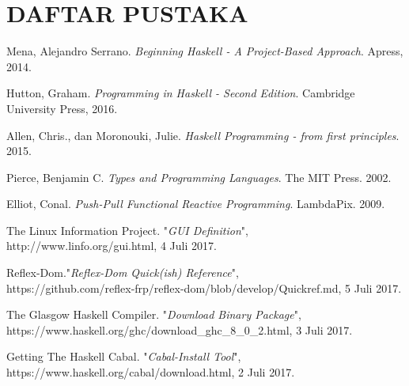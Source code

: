 \documentclass[pi.tex]{subfile}
\begin{document}
\chapter*{DAFTAR PUSTAKA}

\begin{enumerate}[label={[\arabic*].}]

\item Mena, Alejandro Serrano. \emph{Beginning Haskell - A Project-Based Approach}. Apress, 2014.
\item Hutton, Graham. \emph{Programming in Haskell - Second Edition}. Cambridge University Press, 2016.
\item Allen, Chris., dan Moronouki, Julie. \emph{Haskell Programming - from first principles}. 2015.
\item Pierce, Benjamin C. \emph{Types and Programming Languages}. The MIT Press. 2002.
\item Elliot, Conal. \emph{Push-Pull Functional Reactive Programming}. LambdaPix. 2009.
\item The Linux Information Project. "\emph{GUI Definition}", \\
  http://www.linfo.org/gui.html, 4 Juli 2017.
\item Reflex-Dom."\emph{Reflex-Dom Quick(ish) Reference}", \\
  https://github.com/reflex-frp/reflex-dom/blob/develop/Quickref.md, 5 Juli 2017.
\item The Glasgow Haskell Compiler. "\emph{Download Binary Package}",\\
  https://www.haskell.org/ghc/download\_ghc\_8\_0\_2.html, 3 Juli 2017.
\item Getting The Haskell Cabal. "\emph{Cabal-Install Tool}",\\
  https://www.haskell.org/cabal/download.html, 2 Juli 2017.



\end{enumerate}
\end{document}
